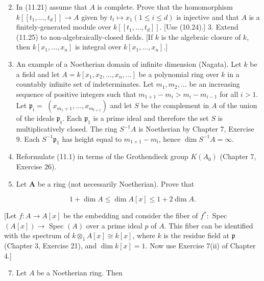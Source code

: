 \documentclass{standalone}
\theoremstyle{definition}
\theoremstyle{remark}
\begin{document}
\begin{enumerate}
  \setcounter{enumi}{1}
  \item In (11.21) assume that $A$ is complete. Prove that the homomorphism $k\left[\left[t_{1}, \ldots, t_{d}\right]\right] \rightarrow A$ given by $t_{t} \mapsto x_{1}(1 \leqslant i \leqslant d)$ is injective and that $A$ is a finitely-generated module over $k\left[\left[t_{1}, \ldots, t_{d}\right]\right]$. [Use (10.24).] 3. Extend (11.25) to non-algebraically-closed fields. [If $k$ is the algebraic closure of $k$, then $k\left[x_{1}, \ldots, x_{n}\right]$ is integral over $k\left[x_{1}, \ldots, x_{n}\right]$.]

  \item An example of a Noetherian domain of infinite dimension (Nagata). Let $k$ be a field and let $A=k\left[x_{1}, x_{2}, \ldots, x_{n}, \ldots\right]$ be a polynomial ring over $k$ in a countably infinite set of indeterminates. Let $m_{1}, m_{2}, \ldots$ be an increasing sequence of positive integers such that $m_{1+1}-m_{i}>m_{i}-m_{i-1}$ for all $i>1$. Let $\mathfrak{p}_{i}=$ $\left(x_{m_{1}+1}, \ldots, x_{m_{t+1}}\right)$ and let $S$ be the complement in $A$ of the union of the ideals $\mathfrak{p}_{\mathfrak{t}}$. Each $\mathfrak{p}_{1}$ is a prime ideal and therefore the set $S$ is multiplicatively closed. The ring $S^{-1} A$ is Noetherian by Chapter 7, Exercise 9. Each $S^{-1} \mathfrak{p}_{1}$ has height equal to $m_{1+1}-m_{\mathrm{i}}$, hence $\operatorname{dim} S^{-1} A=\infty$.

  \item Reformulate (11.1) in terms of the Grothendieck group $K\left(A_{0}\right)$ (Chapter 7, Exercise 26).

  \item Let $\boldsymbol{A}$ be a ring (not necessarily Noetherian). Prove that

\end{enumerate}

\[
1+\operatorname{dim} A \leqslant \operatorname{dim} A[x] \leqslant 1+2 \operatorname{dim} A .
\]

[Let $f: A \rightarrow A[x]$ be the embedding and consider the fiber of $f^{*}:$ Spec $(A[x]) \rightarrow$ Spec $(A)$ over a prime ideal $p$ of $A$. This fiber can be identified with the spectrum of $k \otimes_{1} A[x] \cong k[x]$, where $k$ is the residue field at $\mathfrak{p}$ (Chapter 3, Exercise 21), and $\operatorname{dim} k[x]=1$. Now use Exercise 7(ii) of Chapter 4.]

\begin{enumerate}
  \setcounter{enumi}{6}
  \item Let $A$ be a Noetherian ring. Then
\end{enumerate}
\end{document}
